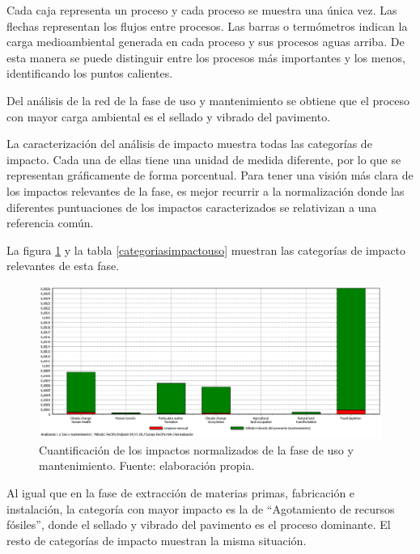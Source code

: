 Cada caja representa un proceso y cada proceso se muestra una única vez. Las flechas representan los flujos entre procesos. Las barras o termómetros indican la carga medioambiental generada en cada proceso y sus procesos aguas arriba. De esta manera se puede distinguir entre los procesos más importantes y los menos, identificando los puntos calientes.

Del análisis de la red de la fase de uso y mantenimiento se obtiene que el proceso con mayor carga ambiental es el sellado y vibrado del pavimento.

La caracterización del análisis de impacto muestra todas las categorías de impacto. Cada una de ellas tiene una unidad de medida diferente, por lo que se representan gráficamente de forma porcentual. Para tener una visión más clara de los impactos relevantes de la fase, es mejor recurrir a la normalización donde las diferentes puntuaciones de los impactos caracterizados se relativizan a una referencia común.

La figura \ref{fig:uso_normalizacion} y la tabla \ref{categoriasimpactouso} muestran las categorías de impacto relevantes de esta fase.

\begin{figure}[!htb]
\centering
\includegraphics[width=15cm]{img/uso_normalizacion.png}
\caption[Cuantificación de los impactos normalizados de la fase de uso y mantenimiento.]{Cuantificación de los impactos normalizados de la fase de uso y mantenimiento. Fuente: elaboración propia.}
\label{fig:uso_normalizacion}
\end{figure}

Al igual que en la fase de extracción de materias primas, fabricación e instalación, la categoría con mayor impacto es la de ``Agotamiento de recursos fósiles'', donde el sellado y vibrado del pavimento es el proceso dominante. El resto de categorías de impacto muestran la misma situación.

